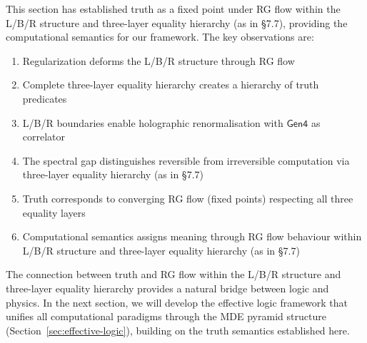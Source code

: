 This section has established truth as a fixed point under RG flow within the L/B/R structure and three-layer equality hierarchy (as in §7.7), providing the computational semantics for our framework. The key observations are:

\begin{enumerate}
\item Regularization deforms the L/B/R structure through RG flow
\item Complete three-layer equality hierarchy creates a hierarchy of truth predicates
\item L/B/R boundaries enable holographic renormalisation with $\mathsf{Gen4}$ as correlator
\item The spectral gap distinguishes reversible from irreversible computation via three-layer equality hierarchy (as in §7.7)
\item Truth corresponds to converging RG flow (fixed points) respecting all three equality layers
\item Computational semantics assigns meaning through RG flow behaviour within L/B/R structure and three-layer equality hierarchy (as in §7.7)
\end{enumerate}

The connection between truth and RG flow within the L/B/R structure and three-layer equality hierarchy provides a natural bridge between logic and physics. In the next section, we will develop the effective logic framework that unifies all computational paradigms through the MDE pyramid structure (Section~\ref{sec:effective-logic}), building on the truth semantics established here.

